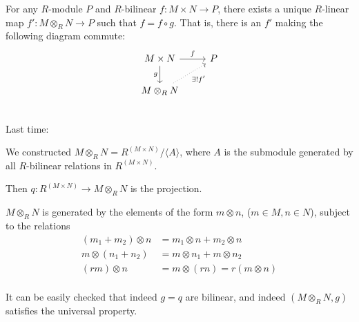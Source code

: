 \documentclass[x11names,reqno,14pt]{extarticle}
\begin{document}
For any $R$-module $P$ and $R$-bilinear $f:M\times N \to P$, there exists a unique $R$-linear map $f':M\otimes_RN\to P$ such that $f = f\circ g$. That is, there is an $f'$ making the following diagram commute:
\[
\begin{tikzcd}
M\times N\ar[d, "g"'] \ar[r, "f"] & P \\
M\otimes_RN\ar[ur, dotted, "\exists!f'"']\\
\end{tikzcd}
\]
Last time:

We constructed $M\otimes_RN = R^{(M\times N)}/\langle A \rangle$, where $A$ is the submodule generated by all $R$-bilinear relations in $R^{(M\times N)}$.

Then $q:R^{(M\times N)}\to M\otimes_RN$ is the projection.

\rem

$M\otimes_RN$ is generated by the elements of the form $m\otimes n$, ($m \in M, n \in N$), subject to the relations
\begin{align*}
(m_1 + m_2)\otimes n & = m_1\otimes n + m_2 \otimes n \\
m\otimes(n_1 + n_2) & = m\otimes n_1 + m\otimes n_2 \\
(rm)\otimes n & = m\otimes(rn)  = r(m\otimes n) \\
\end{align*}

It can be easily checked that indeed $g = q$ are bilinear, and indeed $(M\otimes_RN, g)$ satisfies the universal property. 

\exm\,
\end{document}
